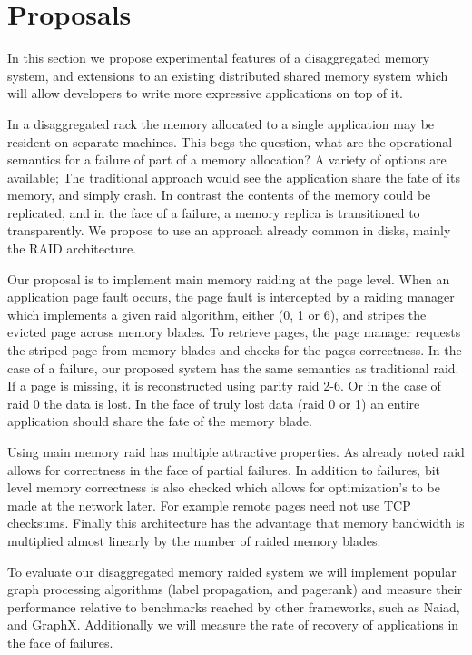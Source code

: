 \section{Proposals}
\label{sec:proposal}
In this section we propose experimental features of a disaggregated
memory system, and extensions to an existing distributed shared memory
system which will allow developers to write more expressive
applications on top of it.


 In a disaggregated
rack the memory allocated to a single application may be resident on
separate machines. This begs the question, what are the operational
semantics for a failure of part of a memory allocation? A variety of
options are available; The traditional approach would see the
application share the fate of its memory, and simply crash. In
contrast the contents of the memory could be replicated, and in the
face of a failure, a memory replica is transitioned to transparently.
We propose to use an approach already common in disks, mainly the RAID
architecture. 

Our proposal is to implement main memory raiding at the page level.
When an application page fault occurs, the page fault is intercepted
by a raiding manager which implements a given raid algorithm, either
(0, 1 or 6), and stripes the evicted page across memory blades. To
retrieve pages, the page manager requests the striped page from memory
blades and checks for the pages correctness. In the case of a failure,
our proposed system has the same semantics as traditional raid. If a
page is missing, it is reconstructed using parity raid 2-6. Or in the
case of raid 0 the data is lost. In the face of truly lost data (raid
0 or 1) an entire application should share the fate of the memory
blade.

Using main memory raid has multiple attractive properties. As already
noted raid allows for correctness in the face of partial failures. In
addition to failures, bit level memory correctness is also checked
which allows for optimization's to be made at the network later. For
example remote pages need not use TCP checksums. Finally this
architecture has the advantage that memory bandwidth is multiplied
almost linearly by the number of raided memory blades.

To evaluate our disaggregated memory raided system we will implement
popular graph processing algorithms (label propagation, and pagerank)
and measure their performance relative to benchmarks reached by other
frameworks, such as Naiad, and GraphX. Additionally we will measure
the rate of recovery of applications in the face of failures. 


